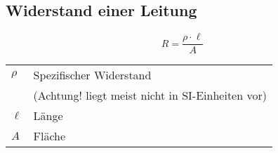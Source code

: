 



\subsection{Widerstand einer Leitung}
\[ R = \frac{\rho \cdot \ell}{A} \]
\begin{tabular}{lp{4.5cm}}
$\rho$&Spezifischer Widerstand\\
&(Achtung! liegt meist nicht in SI-Einheiten vor)\\
$\ell$&Länge\\
   $A$&Fläche
\end{tabular}